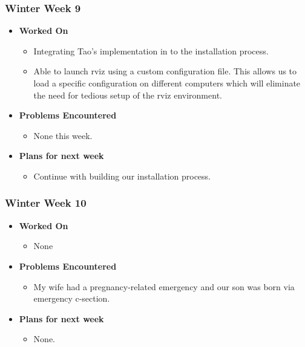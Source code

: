 \documentclass[compsoc,draftclsnofoot,onecolumn,10pt]{IEEEtran}
\begin{document}
\subsubsection{Winter Week 9}
\begin{itemize}
    \item {\textbf{Worked On}}
    \begin{itemize}
        \item Integrating Tao's implementation in to the installation process.
        \item Able to launch rviz using a custom configuration file. This allows us to load a specific configuration on different computers which will eliminate the need for tedious setup of the rviz environment.
    \end{itemize}

    \item {\textbf{Problems Encountered}}
    \begin{itemize}
        \item None this week.
    \end{itemize}

    \item{\textbf{Plans for next week}}
    \begin{itemize}
        \item Continue with building our installation process.
    \end{itemize}
\end{itemize}

\subsubsection{Winter Week 10}
\begin{itemize}
    \item {\textbf{Worked On}}
    \begin{itemize}
        \item None
    \end{itemize}

    \item {\textbf{Problems Encountered}}
    \begin{itemize}
        \item My wife had a pregnancy-related emergency and our son was born via emergency c-section.
    \end{itemize}

    \item{\textbf{Plans for next week}}
    \begin{itemize}
        \item None.
    \end{itemize}
\end{itemize}
\end{document}
